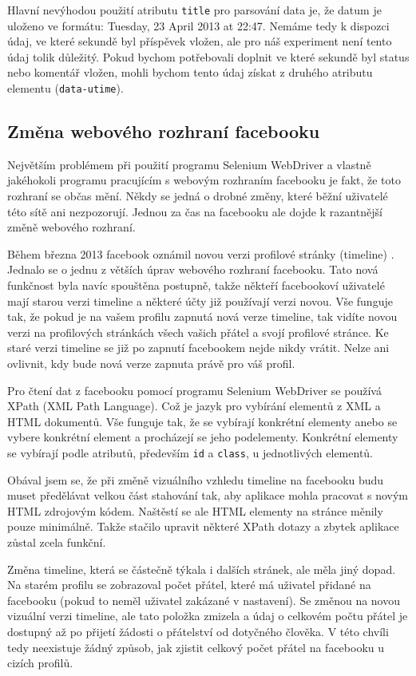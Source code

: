 \documentclass[thesis=M,czech]{FITthesis}[2013/05/10]
\begin{document}
Hlavní nevýhodou použití atributu \verb|title| pro parsování data je, že datum je uloženo ve formátu: Tuesday, 23 April 2013 at 22:47. Nemáme tedy k dispozci údaj, ve které sekundě byl příspěvek vložen, ale pro náš experiment není tento údaj tolik důležitý. Pokud bychom potřebovali doplnit ve které sekundě byl status nebo komentář vložen, mohli bychom tento údaj získat z druhého atributu elementu (\verb|data-utime|). 

\subsection{Změna webového rozhraní facebooku}

Největším problémem při použití programu Selenium WebDriver a vlastně jakéhokoli programu pracujícím s webovým rozhraním facebooku je fakt, že toto rozhraní se občas mění. Někdy se jedná o drobné změny, které běžní uživatelé této sítě ani nezpozorují. Jednou za čas na facebooku ale dojde k razantnější změně webového rozhraní.

Během března 2013 facebook oznámil novou verzi profilové stránky (timeline) \cite{web:fbTimelineImprovements}. Jednalo se o jednu z větších úprav webového rozhraní facebooku. Tato nová funkčnost byla navíc spouštěna postupně, takže někteří facebookoví uživatelé mají starou verzi timeline a některé účty již používají verzi novou. Vše funguje tak, že pokud je na vašem profilu zapnutá nová verze timeline, tak vidíte novou verzi na profilových stránkách všech vašich přátel a svojí profilové stránce. Ke staré verzi timeline se již po zapnutí facebookem nejde nikdy vrátit. Nelze ani ovlivnit, kdy bude nová verze zapnuta právě pro váš profil.

Pro čtení dat z facebooku pomocí programu Selenium WebDriver se používá XPath (XML Path Language). Což je jazyk pro vybírání elementů z XML a HTML dokumentů. Vše funguje tak, že se vybírají konkrétní elementy anebo se vybere konkrétní element a procházejí se jeho podelementy. Konkrétní elementy se vybírají podle atributů, především \verb|id| a \verb|class|, u jednotlivých elementů.

Obával jsem se, že při změně vizuálního vzhledu timeline na facebooku budu muset předělávat velkou část stahování tak, aby aplikace mohla pracovat s novým HTML zdrojovým kódem. Naštěstí se ale HTML elementy na stránce měnily pouze minimálně. Takže stačilo upravit některé XPath dotazy a zbytek aplikace zůstal zcela funkční.

Změna timeline, která se částečně týkala i dalších stránek, ale měla jiný dopad. Na starém profilu se zobrazoval počet přátel, které má uživatel přidané na facebooku (pokud to neměl uživatel zakázané v nastavení). Se změnou na novou vizuální verzi timeline, ale tato položka zmizela a údaj o celkovém počtu přátel je dostupný až po přijetí žádosti o přátelství od dotyčného člověka. V této chvíli tedy neexistuje žádný způsob, jak zjistit celkový počet přátel na facebooku u cizích profilů. 
\end{document}
